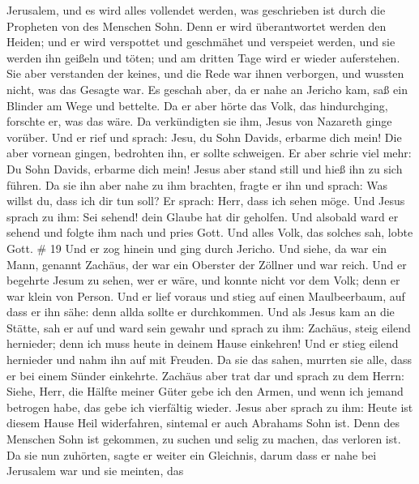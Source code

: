 Jerusalem, und es wird alles vollendet werden, was geschrieben ist durch
die Propheten von des Menschen Sohn.  Denn er wird
überantwortet werden den Heiden; und er wird verspottet und geschmähet
und verspeiet werden,  und sie werden ihn geißeln und
töten; und am dritten Tage wird er wieder auferstehen.  Sie
aber verstanden der keines, und die Rede war ihnen verborgen, und
wussten nicht, was das Gesagte war.  Es geschah aber, da er
nahe an Jericho kam, saß ein Blinder am Wege und bettelte. 
Da er aber hörte das Volk, das hindurchging, forschte er, was das wäre.
 Da verkündigten sie ihm, Jesus von Nazareth ginge vorüber.
 Und er rief und sprach: Jesu, du Sohn Davids, erbarme dich
mein!  Die aber vornean gingen, bedrohten ihn, er sollte
schweigen. Er aber schrie viel mehr: Du Sohn Davids, erbarme dich mein!
 Jesus aber stand still und hieß ihn zu sich führen. Da sie
ihn aber nahe zu ihm brachten, fragte er ihn  und sprach:
Was willst du, dass ich dir tun soll? Er sprach: Herr, dass ich sehen
möge.  Und Jesus sprach zu ihm: Sei sehend! dein Glaube hat
dir geholfen.  Und alsobald ward er sehend und folgte ihm
nach und pries Gott. Und alles Volk, das solches sah, lobte Gott. \# 19
 Und er zog hinein und ging durch Jericho.  Und
siehe, da war ein Mann, genannt Zachäus, der war ein Oberster der
Zöllner und war reich.  Und er begehrte Jesum zu sehen, wer
er wäre, und konnte nicht vor dem Volk; denn er war klein von Person.
 Und er lief voraus und stieg auf einen Maulbeerbaum, auf
dass er ihn sähe: denn allda sollte er durchkommen.  Und als
Jesus kam an die Stätte, sah er auf und ward sein gewahr und sprach zu
ihm: Zachäus, steig eilend hernieder; denn ich muss heute in deinem
Hause einkehren!  Und er stieg eilend hernieder und nahm ihn
auf mit Freuden.  Da sie das sahen, murrten sie alle, dass
er bei einem Sünder einkehrte.  Zachäus aber trat dar und
sprach zu dem Herrn: Siehe, Herr, die Hälfte meiner Güter gebe ich den
Armen, und wenn ich jemand betrogen habe, das gebe ich vierfältig
wieder.  Jesus aber sprach zu ihm: Heute ist diesem Hause
Heil widerfahren, sintemal er auch Abrahams Sohn ist.  Denn
des Menschen Sohn ist gekommen, zu suchen und selig zu machen, das
verloren ist.  Da sie nun zuhörten, sagte er weiter ein
Gleichnis, darum dass er nahe bei Jerusalem war und sie meinten, das
